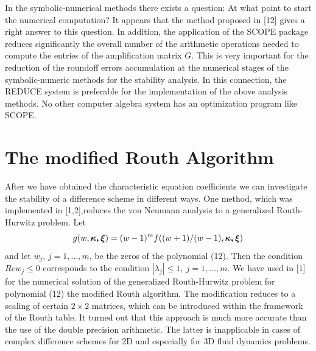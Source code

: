    In the symbolic-numerical methods there exists a question: At what point to
start the numerical computation? It appears that the method proposed in [12]
gives a right answer to this question. In addition, the application of the
SCOPE package reduces significantly the overall number of the arithmetic
operations needed to compute the entries of the amplification matrix $G$. This
is very important for the reduction of the roundoff errors accumulation at the
numerical stages of the symbolic-numeric methods for the stability analysis.
In this connection, the REDUCE system is preferable for the implementation of
the above analysis methods. No other computer algebra system has an optimization
program like SCOPE.

\section{The modified Routh Algorithm}
\hspace{6mm}

   After we have obtained the characteristic equation coefficients we can
investigate the stability of a difference scheme in different ways. One method,
which was implemented in [1,2],reduces the von Neumann analysis to a
generalized Routh-Hurwitz problem. Let
\begin{equation}
g(w,\mbox{\boldmath $\kappa,\xi$\unboldmath})= (w-1)^m f((w+1)/(w-1),
\mbox{\boldmath $\kappa,\xi$\unboldmath})
\end{equation}
and let $w_j$, $j=1,\ldots,m$, be the zeros of the polynomial (12). Then the
condition $Re w_j\leq 0$ corresponds to the condition $|\lambda_j|\leq 1,~
j=1,\ldots,m.$ We have used in [1] for the numerical solution of the
generalized Routh-Hurwitz problem for polynomial (12) the modified Routh
algorithm. The modification reduces to a scaling of certain $2\times 2$
matrices, which can be introduced within the framework of the Routh table. It
turned out that this approach is much more accurate than the use of the
double precision arithmetic. The latter is inapplicable in cases of complex
difference schemes for 2D and especially for 3D fluid dynamics problems.

